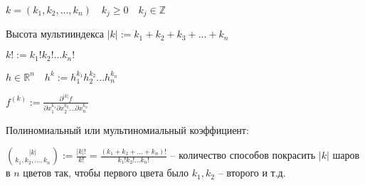 
\begin{definition}[Мультииндекс] \thmslashn


$k = (k_1, k_2,..., k_n) \quad k_j \geq 0 \quad k_j \in \mathbb{Z}$

Высота мультииндекса $|k| := k_1+k_2+k_3+...+k_n$

$k! := k_1!k_2!...k_n!$

$h \in \mathbb{R}^n \quad h^k := h_1^{k_1}h_2^{k_2}...h_n^{k_n}$

$f^{(k)} := \frac{\partial^{|k|}f}{\partial x_1^{k_1} \partial x_2^{k_2}...\partial x_n^{k_n}}$

Полиномиальный или мультиномиальный коэффициент:

$\binom{|k|}{k_1, k_2, ..., k_n} := \frac{|k|!}{k!} = \frac{(k_1+k_2+...+k_n)!}{k_1!k_2!...k_n!}$ -- количество способов покрасить $|k|$ шаров в $n$ цветов так, чтобы первого цвета было $k_1, k_2$ --  второго и т.д.

\end{definition}


